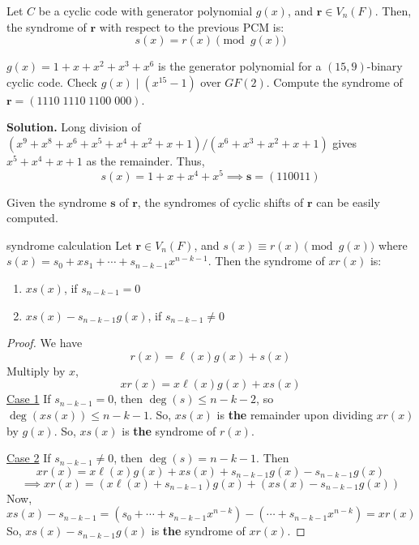 \begin{Theorem}{}{}
    Let $ C $ be a cyclic code with generator polynomial $ g(x) $, and $ \bm{r}\in V_n(F) $.
    Then, the syndrome of $ \bm{r} $ with respect to the previous PCM is:
    \[ s(x)=r(x)\pmod{g(x)} \]
\end{Theorem}

\begin{Example}{}{}
    $ g(x)=1+x+x^2+x^3+x^6 $ is the generator polynomial for a $ (15,9) $-binary cyclic code.
    Check $ g(x)\mid (x^{15}-1) $ over $ GF(2) $. Compute the syndrome of
    $ \bm{r}=(1110\; 1110\; 1100\; 000) $.

    \textbf{Solution.} Long division of $ (x^9+x^8+x^6+x^5+x^4+x^2+x+1)/(x^6+x^3+x^2+x+1) $
    gives $ x^5+x^4+x+1 $ as the remainder. Thus,
    \[ s(x)=1+x+x^4+x^5\implies \bm{s}=(110011) \]
\end{Example}

\begin{Remark}{}{}
    Given the syndrome $ \bm{s} $ of $ \bm{r} $, the syndromes of cyclic shifts of $ \bm{r} $
    can be easily computed.
\end{Remark}

\begin{Theorem}{}{syndrome calculation}
    Let $ \bm{r}\in V_n(F) $, and $ s(x) \equiv r(x)\pmod{g(x)} $ where
    $ s(x) = s_0+xs_1+\cdots+s_{n-k-1}x^{n-k-1} $.
    Then the syndrome of $ xr(x) $ is:
    \begin{enumerate}[label=(\roman*)]
        \item $ xs(x) $, if $ s_{n-k-1}=0 $
        \item $ xs(x)-s_{n-k-1}g(x) $, if $ s_{n-k-1}\neq 0 $
    \end{enumerate}
\end{Theorem}

\begin{proof}
    We have
    \[ r(x)=\ell (x)g(x)+s(x) \]
    Multiply by $ x $,
    \[ xr(x)=x\ell(x)g(x)+xs(x) \]
    \underline{Case 1} If $ s_{n-k-1}=0 $, then $ \deg(s)\leqslant n-k-2 $,
    so $ \deg(xs(x))\leqslant n-k-1 $. So, $ xs(x) $ is \textbf{the} remainder upon dividing
    $ xr(x) $ by $ g(x) $. So, $ xs(x) $ is \textbf{the} syndrome of $ r(x) $.

    \underline{Case 2} If $ s_{n-k-1}\neq 0 $, then $ \deg(s)=n-k-1 $. Then
    \[ xr(x)=x\ell(x)g(x)+xs(x)+s_{n-k-1}g(x)-s_{n-k-1}g(x) \]
    \[ \implies xr(x)=(x\ell(x)+s_{n-k-1})g(x)+(xs(x)-s_{n-k-1}g(x)) \]
    Now,
    \[ xs(x)-s_{n-k-1}=(s_0+\cdots+s_{n-k-1}x^{n-k})-(\cdots+s_{n-k-1}x^{n-k})=xr(x) \]
    So, $ xs(x)-s_{n-k-1}g(x) $ is \textbf{the} syndrome of $ xr(x) $.
\end{proof}

